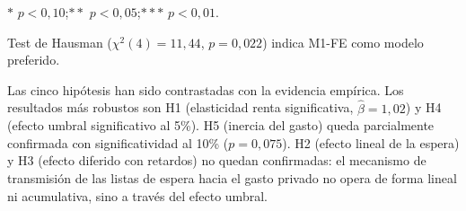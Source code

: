 \begin{table}[htbp]
  \centering
  \caption{Estado final de las hipótesis de investigación}
  \label{tab:conclusiones_hip}
  \begin{threeparttable}
    \small
    \begin{tablenotes}[flushleft]
      \footnotesize
      \item $*$ $p < 0{,}10$;\quad $**$ $p < 0{,}05$;\quad $***$ $p < 0{,}01$.
      \item Test de Hausman ($\chi^2(4)=11{,}44$, $p=0{,}022$) indica M1-FE como
        modelo preferido.
    \end{tablenotes}
  \end{threeparttable}
\end{table}

Las cinco hipótesis han sido contrastadas con la evidencia empírica. Los resultados
más robustos son H1 (elasticidad renta significativa, $\hat{\beta} = 1{,}02$) y
H4 (efecto umbral significativo al 5\%). H5 (inercia del gasto) queda
parcialmente confirmada con significatividad al 10\% ($p = 0{,}075$). H2 (efecto
lineal de la espera) y H3 (efecto diferido con retardos) no quedan confirmadas:
el mecanismo de transmisión de las listas de espera hacia el gasto privado no
opera de forma lineal ni acumulativa, sino a través del efecto umbral.

